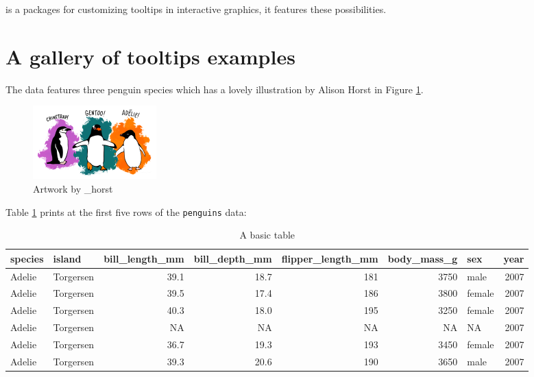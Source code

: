  is a packages for customizing tooltips in interactive
graphics, it features these possibilities.

\hypertarget{a-gallery-of-tooltips-examples}{%
\section{A gallery of tooltips
examples}\label{a-gallery-of-tooltips-examples}}

The  data \citep{palmerpenguins} features three
penguin species which has a lovely illustration by Alison Horst in
Figure \ref{fig:penguins-alison}.

\begin{Schunk}
\begin{figure}
\includegraphics[width=1\linewidth,height=0.3\textheight]{penguins} \caption[Artwork by \@allison\_horst]{Artwork by \@allison\_horst}\label{fig:penguins-alison}
\end{figure}
\end{Schunk}

Table \ref{tab:penguins-tab-static} prints at the first five rows of the
\texttt{penguins} data:

\begin{Schunk}
\begin{table}

\caption{\label{tab:penguins-tab-static}A basic table}
\centering
\fontsize{7}{9}\selectfont
\begin{tabular}[t]{l|l|r|r|r|r|l|r}
\hline
species & island & bill\_length\_mm & bill\_depth\_mm & flipper\_length\_mm & body\_mass\_g & sex & year\\
\hline
Adelie & Torgersen & 39.1 & 18.7 & 181 & 3750 & male & 2007\\
\hline
Adelie & Torgersen & 39.5 & 17.4 & 186 & 3800 & female & 2007\\
\hline
Adelie & Torgersen & 40.3 & 18.0 & 195 & 3250 & female & 2007\\
\hline
Adelie & Torgersen & NA & NA & NA & NA & NA & 2007\\
\hline
Adelie & Torgersen & 36.7 & 19.3 & 193 & 3450 & female & 2007\\
\hline
Adelie & Torgersen & 39.3 & 20.6 & 190 & 3650 & male & 2007\\
\hline
\end{tabular}
\end{table}

\end{Schunk}

